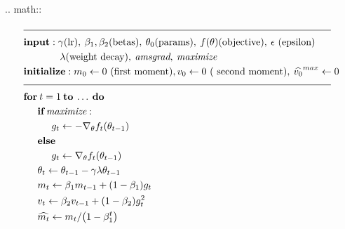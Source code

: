 \documentclass[]{article}
\begin{document}
.. math::
    \begin{align}
        &\rule{110mm}{0.4pt}                                                                 \\
        &\textbf{input}      : \gamma \text{(lr)}, \: \beta_1, \beta_2
            \text{(betas)}, \: \theta_0 \text{(params)}, \: f(\theta) \text{(objective)},
            \: \epsilon \text{ (epsilon)}                                                    \\
        &\hspace{13mm}      \lambda \text{(weight decay)},  \: \textit{amsgrad},
            \: \textit{maximize}                                                             \\
        &\textbf{initialize} : m_0 \leftarrow 0 \text{ (first moment)}, v_0 \leftarrow 0
            \text{ ( second moment)}, \: \widehat{v_0}^{max}\leftarrow 0              \\[-1.ex]
        &\rule{110mm}{0.4pt}                                                                 \\
        &\textbf{for} \: t=1 \: \textbf{to} \: \ldots \: \textbf{do}                         \\
        &\hspace{5mm}\textbf{if} \: \textit{maximize}:                                       \\
        &\hspace{10mm}g_t           \leftarrow   -\nabla_{\theta} f_t (\theta_{t-1})          \\
        &\hspace{5mm}\textbf{else}                                                           \\
        &\hspace{10mm}g_t           \leftarrow   \nabla_{\theta} f_t (\theta_{t-1})           \\
        &\hspace{5mm} \theta_t \leftarrow \theta_{t-1} - \gamma \lambda \theta_{t-1}         \\
        &\hspace{5mm}m_t           \leftarrow   \beta_1 m_{t-1} + (1 - \beta_1) g_t          \\
        &\hspace{5mm}v_t           \leftarrow   \beta_2 v_{t-1} + (1-\beta_2) g^2_t          \\
        &\hspace{5mm}\widehat{m_t} \leftarrow   m_t/\big(1-\beta_1^t \big)                   \\

\end{align}
\end{document}

